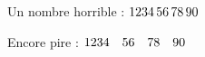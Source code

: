 \documentclass[10pt, a4paper]{article}
\newcommand\ugly[2][\,]{ %
		\begingroup %
			\noexpandarg\StrSubstitute{#2}{.}{#1} %
		\endgroup %
	}
\begin{document}
	Un nombre horrible : $\ugly{1234.56.78.90}$

	Encore pire : $\ugly[\quad]{1234.56.78.90}$
\end{document}
